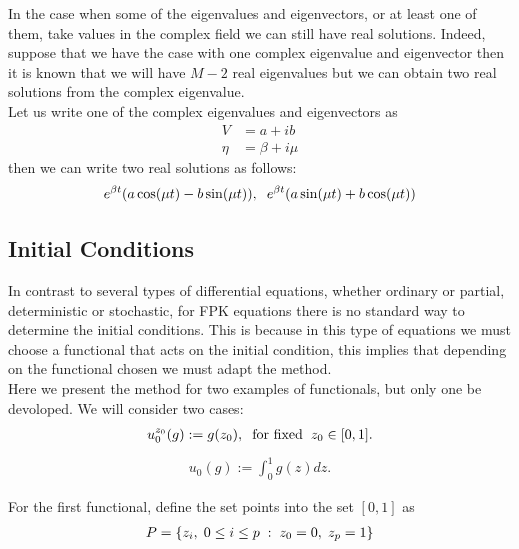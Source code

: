     \noindent In the case when some of the eigenvalues and eigenvectors, or at least one of them, take values in the complex field we can still have real solutions. Indeed, suppose that we have the case with one complex eigenvalue and eigenvector then it is known that we will have $M - 2$ real eigenvalues but we can obtain two real solutions from the complex eigenvalue. \\
    
    \noindent Let us write one of the complex eigenvalues and eigenvectors as
    \begin{align*}
    	V &= a + i b \\
    	\eta &= \beta + i \mu
    \end{align*}
    then we can write two real solutions as follows:
    \begin{align*}
    	e^{\beta t} (a \cos(\mu t) - b \sin(\mu t)), \hspace{2mm} e^{\beta t} (a \sin(\mu t) + b \cos(\mu t))
    \end{align*}
    
    \subsection{Initial Conditions}
    
    In contrast to several types of differential equations, whether ordinary or partial, deterministic or stochastic, for FPK equations there is no standard way to determine the initial conditions. This is because in this type of equations we must choose a functional that acts on the initial condition, this implies that depending on the functional chosen we must adapt the method. \\
    
    \noindent Here we present the method for two examples of functionals, but only one be devoloped. We will consider two cases:
    \begin{align*}
    	u^{z_0}_0 (g) := g(z_0), \hspace{2mm} \text{for fixed} \hspace{2mm} z_0 \in [0, 1].
    \end{align*}
    \begin{align*}
    	u_0 (g) := \displaystyle \int_{0}^{1} g(z) dz.
    \end{align*}
    
    \noindent For the first functional, define the set points into the set $[0, 1]$ as 
    \begin{align*}
    	P = \{ z_i, \hspace{1mm} 0 \leq i \leq p \hspace{1mm} : \hspace{1mm} z_0 = 0, \hspace{1mm} z_p = 1 \}
    \end{align*}
    
